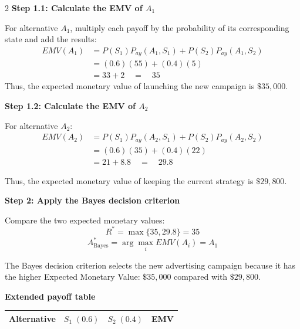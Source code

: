 \begin{multicols}{2}
		\textbf{Step 1.1: Calculate the EMV of $A_1$}
		
		For alternative $A_1$, multiply each payoff by the probability of its
		corresponding state and add the results:
		\[
		\begin{aligned}
			EMV(A_1)
			&=
			P(S_1)P_{ay}(A_1,S_1)
			+
			P(S_2)P_{ay}(A_1,S_2)
			\\
			&=
			(0.6)(55)+(0.4)(5)
			\\
			&=
			33+2 \quad  = \quad 
			35
		\end{aligned} 
		\]
		Thus, the expected monetary value of launching the new campaign is
		$\$35,000$.
	
		
		\textbf{Step 1.2: Calculate the EMV of $A_2$}
		
		For alternative $A_2$:
		\[
		\begin{aligned}
			EMV(A_2)
			&=
			P(S_1)P_{ay}(A_2,S_1)
			+
			P(S_2)P_{ay}(A_2,S_2)
			\\
			&=
			(0.6)(35)+(0.4)(22)
			\\
			&=
			21+8.8
			\quad  = \quad 
			29.8
		\end{aligned}
		\]\vspace{-3mm}
		
		Thus, the expected monetary value of keeping the current strategy is
		$\$29,800$.
		
		\textbf{Step 2: Apply the Bayes decision criterion}
		
		Compare the two expected monetary values:
		\[
		R^*
		=
		\max\{35,29.8\}
		=
		35
		\] \vspace{-4mm}
		\[
		A^*_{\mathrm{Bayes}}
		=
		\arg\max_i EMV(A_i)
		=
		A_1
		\]
		
		The Bayes decision criterion selects the new advertising campaign
		because it has the higher Expected Monetary Value:
		$\$35,000$ compared with $\$29,800$.
		
		\setlength{\columnseprule}{0pt}
		
		

		
		\textbf{Extended payoff table}
		\vspace{-6mm}
		\begin{center}
			\small
			\renewcommand{\arraystretch}{1.5}
			\setlength{\tabcolsep}{4pt}
			
			\begin{tabular}{lccc}
				\toprule
				Alternative
				& $S_1\;(0.6)$
				& $S_2\;(0.4)$
				& EMV
				\\
				\midrule
				

\end{tabular}
\end{center}
\end{multicols}
